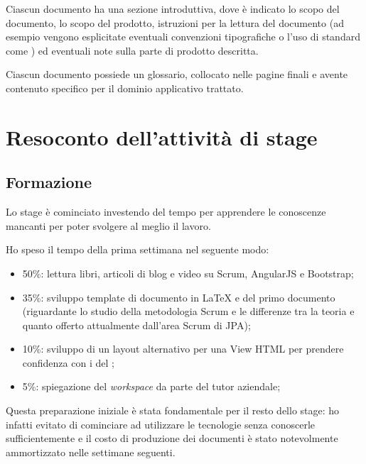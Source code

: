 Ciascun documento ha una sezione introduttiva, dove è indicato lo scopo del
documento, lo scopo del prodotto, istruzioni per la lettura del documento (ad
esempio vengono esplicitate eventuali convenzioni tipografiche o l'uso di
standard come ) ed eventuali note sulla parte di prodotto descritta.

Ciascun documento possiede un glossario, collocato nelle pagine finali e
avente contenuto specifico per il dominio applicativo trattato.

\section{Resoconto dell'attività di stage}

\subsection{Formazione}

Lo stage è cominciato investendo del tempo per apprendere le conoscenze
mancanti per poter svolgere al meglio il lavoro.

Ho speso il tempo della prima settimana nel seguente modo:

\begin{itemize}
\item 50\%: lettura libri, articoli di blog e video su Scrum, AngularJS e
  Bootstrap;
\item 35\%: sviluppo template di documento in \LaTeX{} e del primo documento
  (riguardante lo studio della metodologia Scrum e le differenze tra la teoria
  e quanto offerto attualmente dall'area Scrum di JPA);
\item 10\%: sviluppo di un layout alternativo per una View HTML per prendere
  confidenza con i  del \FREND;
\item 5\%: spiegazione del \emph{workspace} da parte del tutor aziendale;
\end{itemize}

Questa preparazione iniziale è stata fondamentale per il resto dello stage: ho
infatti evitato di cominciare ad utilizzare le tecnologie senza conoscerle
sufficientemente e il costo di produzione dei documenti è stato notevolmente
ammortizzato nelle settimane seguenti.

